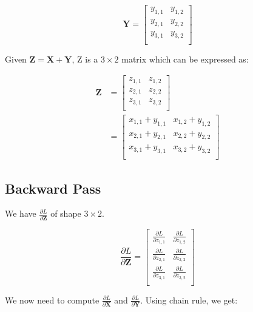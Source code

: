 \documentclass{article}
\newcommand{\matr}[1]{\mathbf{#1}} %
\begin{document}
\begin{displaymath}
\matr{Y} =
\begin{bmatrix}
y_{1,1} & y_{1,2} \\%
y_{2,1} & y_{2,2} \\%
y_{3,1} & y_{3,2} \\%
\end{bmatrix}
\end{displaymath}

Given $\matr{Z} = \matr{X} + \matr{Y}$, Z is a $3 \times 2$ matrix which can be expressed as:

\begin{align}
\matr{Z} &= \begin{bmatrix}
z_{1,1} & z_{1,2}\\[0.5em]
z_{2,1} & z_{2,2}\\[0.5em]
z_{3,1} & z_{3,2}\\[0.5em]
\end{bmatrix}
\\
&=
\begin{bmatrix}
x_{1,1} + y_{1,1} & x_{1,2} + y_{1,2} \\[0.5em]
x_{2,1} + y_{2,1} & x_{2,2} + y_{2,2} \\[0.5em]
x_{3,1} + y_{3,1} & x_{3,2} + y_{3,2} \\[0.5em]
\end{bmatrix}
\end{align}

\subsection{Backward Pass}
We have $\frac{\partial L}{\partial \matr{Z}}$ of shape $3 \times 2$.

\begin{displaymath}
\frac{\partial L}{\partial \matr{Z}} =
\begin{bmatrix}
\frac{\partial L}{\partial z_{1,1}} & \frac{\partial L}{\partial z_{1,2}} \\[0.5em]
\frac{\partial L}{\partial z_{2,1}} & \frac{\partial L}{\partial z_{2,2}} \\[0.5em]
\frac{\partial L}{\partial z_{3,1}} & \frac{\partial L}{\partial z_{3,2}} \\[0.5em]
\end{bmatrix}
\end{displaymath}

We now need to compute $\frac{\partial L}{\partial \matr{X}}$ and $\frac{\partial L}{\partial \matr{Y}}$. Using chain rule, we get:
\end{document}
